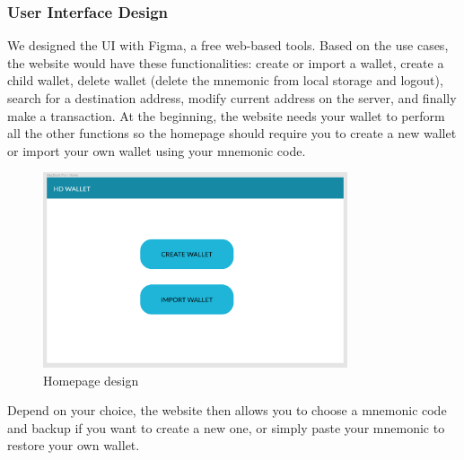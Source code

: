 \subsubsection{User Interface Design}
\bigskip

We designed the UI with Figma, a free web-based tools. Based on the use cases, the website would have these functionalities: create or import a wallet, create a child wallet, delete wallet (delete the mnemonic from local storage and logout), search for a destination address, modify current address on the server, and finally make a transaction. At the beginning, the website needs your wallet to perform all the other functions so the homepage should require you to create a new wallet or import your own wallet using your mnemonic code.

\begin{figure}[!h]
  \centering
  \includegraphics[width=0.8\textwidth]{images/component01.png}
  \caption[Homepage design]{Homepage design}
  \label{fig:homepage_desgin}
\end{figure}


Depend on your choice, the website then allows you to choose a mnemonic code and backup if you want to create a new one, or simply paste your mnemonic to restore your own wallet.

